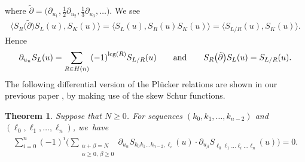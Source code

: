 \documentclass[pdftex]{sigma}
\numberwithin{equation}{section}
\newtheorem{Theorem}{Theorem}[section]
\begin{document}
where $\tilde{\partial}=\bigl(\partial_{u_1},\frac{1}{2}\partial_{u_2},\frac{1}{3}\partial_{u_3},\dots\bigr)$. We see
\begin{align*}
\bigl\langle S_{R}\bigl(\tilde{\partial}\bigr)S_{L}(u), S_{K}(u)\bigr\rangle =\langle S_{L}(u),S_{R}(u)S_{K}(u)\rangle
=\langle S_{L/R}(u), S_{K}(u)\rangle.
\end{align*}
Hence
\begin{gather*}
\partial_{u_n}S_{L}(u)=\sum_{R\in H(n)}{(-1)}^{{\rm leg}(R)}S_{L/R}(u)\qquad \mbox{and}\qquad S_{R}\bigl(\tilde{\partial}\bigr)S_{L}(u)=S_{L/R}(u).
\end{gather*}
The following differential version of the Pl\"ucker relations are shown in our previous paper \cite{asy3}, by making use of the skew Schur functions.

\begin{Theorem}
Suppose that $N\geq0$. For sequences $(k_{0},k_1,\dots,k_{n-2})$ and $(\ell_0,\ell_1,\dots, \ell_{n})$, we~have
\begin{gather*}
\sum_{i= 0}^{n}{(-1)}^{i}\Biggl(\sum_{\substack{\alpha+\beta=N\\ \alpha\geq 0,\,\beta \geq 0}}\partial_{u_\alpha}S_{k_0 k_1 \dots k_{n-2},\ell_i}(u)\cdot \partial_{u_\beta}S_{\ell_0 \ell_1 \dots \widehat{\ell_i} \dots \ell_{n}}(u) \Biggr)=0.
\end{gather*}
\end{Theorem}
\end{document}
